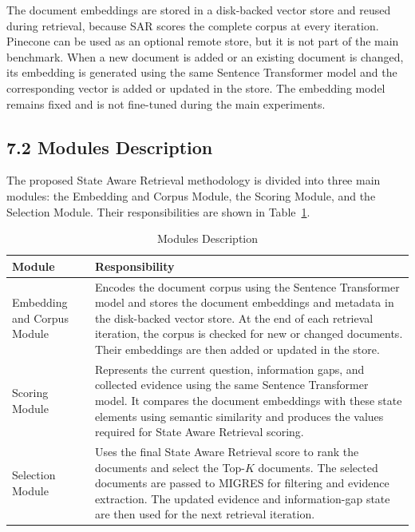 \documentclass[12pt,a4paper]{report}
\begin{document}
The document embeddings are stored in a disk-backed vector store and
reused during retrieval, because SAR scores the complete corpus at every
iteration. Pinecone can be used as an optional remote store, but
it is not part of the main benchmark. When a new document is added or an
existing document is changed, its embedding is generated using the same
Sentence Transformer model and the corresponding vector is added or
updated in the store. The embedding model remains fixed and is not
fine-tuned during the main experiments.

\subsection*{7.2 Modules Description}

The proposed State Aware Retrieval methodology is divided into three
main modules: the Embedding and Corpus Module, the Scoring Module, and
the Selection Module. Their responsibilities are shown in
Table~\ref{tab:module-description}.

\begin{table}[H]
\centering
\caption{Modules Description}
\label{tab:module-description}
\renewcommand{\arraystretch}{1.25}
\begin{tabular}{|p{1.75in}|p{4.3in}|}
\hline
\textbf{Module} & \textbf{Responsibility} \\ \hline

Embedding and Corpus Module &
Encodes the document corpus using the Sentence Transformer model and
stores the document embeddings and metadata in the disk-backed vector
store. At the end of each retrieval iteration, the corpus is checked for
new or changed documents. Their embeddings are then added or updated in
the store.
\\ \hline

Scoring Module &
Represents the current question, information gaps, and collected
evidence using the same Sentence Transformer model. It compares the
document embeddings with these state elements using semantic
similarity and produces the values required for State Aware Retrieval
scoring. \\ \hline

Selection Module &
Uses the final State Aware Retrieval score to rank the documents and
select the Top-$K$ documents. The selected documents are passed to
MIGRES for filtering and evidence extraction. The updated evidence and
information-gap state are then used for the next retrieval iteration.
\\ \hline

\end{tabular}
\end{table}
\end{document}

